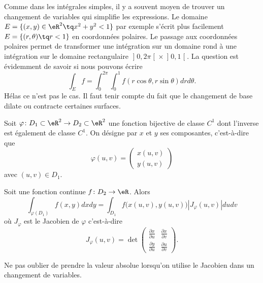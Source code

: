 Comme dans les intégrales simples, il y a souvent moyen de trouver un changement de variables qui simplifie les expressions.  Le domaine $E=\{ (x,y)\in\eR^2\tq x^2+y^2<1 \}$ par exemple s'écrit plus facilement $E=\{ (r,\theta)\tq r<1 \}$ en coordonnées polaires. Le passage aux coordonnées polaires permet de transformer une intégration sur un domaine rond à une intégration sur le domaine rectangulaire $\mathopen]0,2\pi\mathclose[\times\mathopen]0,1\mathclose[$. La question est évidemment de savoir si nous pouvons écrire
\begin{equation}
	\int_Ef=\int_{0}^{2\pi}\int_0^1f(r\cos\theta,r\sin\theta)drd\theta.
\end{equation}
Hélas ce n'est pas le cas. Il faut tenir compte du fait que le changement de base dilate ou contracte certaines surfaces.

Soit $\varphi\colon D_1\subset\eR^2\to D_2\subset \eR^2$ une fonction bijective de classe $C^1$ dont l'inverse est également de classe $C^1$. On désigne par $x$ et $y$ ses composantes, c'est-à-dire que
\begin{equation}
    \varphi(u,v)=\begin{pmatrix}
        x(u,v)    \\
        y(u,v)
    \end{pmatrix}
\end{equation}
avec $(u,v)\in D_1$.

\begin{theorem}     \label{ThoChamDeVarIntDDf}
    Soit une fonction continue $f\colon D_2\to \eR$. Alors
    \begin{equation}
        \int_{\varphi(D_1)}f(x,y)dxdy=\int_{D_1}f\big( x(u,v),y(u,v) \big)| J_{\varphi}(u,v) |dudv
    \end{equation}
    où $J_{\varphi}$ est le Jacobien de $\varphi$ c'est-à-dire
    \begin{equation}
        J_{\varphi}(u,v)=\det\begin{pmatrix}
            \frac{ \partial x }{ \partial u }    &   \frac{ \partial x }{ \partial v }    \\
            \frac{ \partial y }{ \partial u }    &   \frac{ \partial u }{ \partial v }
        \end{pmatrix}.
    \end{equation}
\end{theorem}
Ne pas oublier de prendre la valeur absolue lorsqu'on utilise le Jacobien dans un changement de variables.

